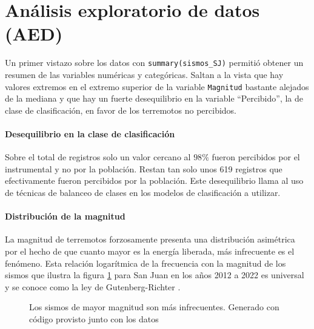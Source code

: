 \documentclass[a4paper]{report}
\begin{document}






\section{Análisis exploratorio de datos (AED)}\label{sec:AED}

Un primer vistazo sobre los datos con \verb'summary(sismos_SJ)' permitió obtener un resumen de las variables numéricas y categóricas.
Saltan a la vista que hay valores extremos en el extremo superior de la variable \verb'Magnitud' bastante alejados de la mediana y que hay un fuerte desequilibrio en la variable ``Percibido'', la de clase de clasificación, en favor de los terremotos no percibidos.


\paragraph{Desequilibrio en la clase de clasificación}
Sobre el total de registros solo un valor cercano al \(98\%\) fueron percibidos por el instrumental y no por la población.
Restan tan solo unos 619 registros que efectivamente fueron percibidos por la población.
Este desequilibrio llama al uso de técnicas de balanceo de clases en los modelos de clasificación a utilizar.


\paragraph{Distribución de la magnitud}
La magnitud de terremotos forzosamente presenta una distribución asimétrica por el hecho de que cuanto mayor es la energía liberada, más infrecuente es el fenómeno.
Esta relación logarítmica de la frecuencia con la magnitud de los sismos que ilustra la figura \ref{fig:acumulado_anual_magnitud} para San Juan en los años 2012 a 2022 es universal y se conoce como la ley de Gutenberg-Richter \cite[ec. 4.24]{fowler_solid_1990}.

\begin{figure}[!ht]
\centering

\caption{Los sismos de mayor magnitud son más infrecuentes. Generado con código provisto junto con los datos \cite[sección 4.2.1]{daniela_parada_ic-datasets-docencia_nodate}}
\label{fig:acumulado_anual_magnitud}
\end{figure}
\end{document}

